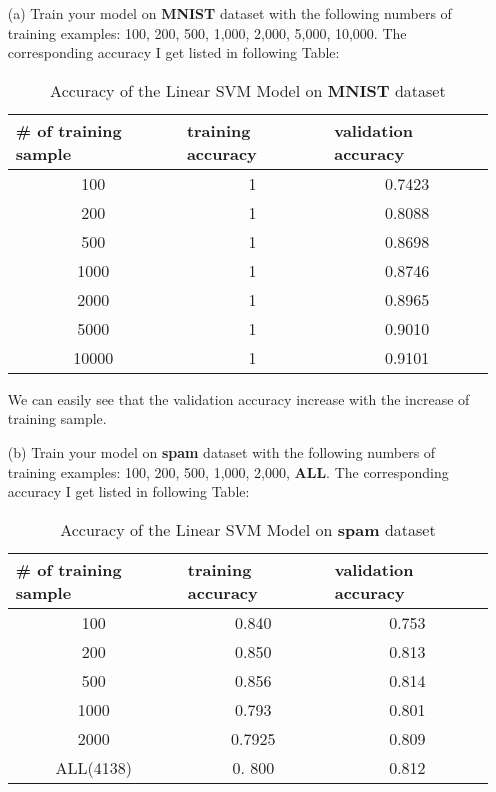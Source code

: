 \documentclass[a4paper,12pt]{article}
\begin{document}
\begin{itemize}
\item[(a)]Train your model on \textbf{MNIST} dataset with the following numbers of training examples: 100, 200, 500, 1,000, 2,000, 5,000, 10,000. The corresponding accuracy I get listed in following Table:
\begin{table}[htbp]
  \centering
  \caption{Accuracy of the Linear SVM Model on \textbf{MNIST} dataset}
    \begin{tabular}{ccc}
    \multicolumn{1}{l}{\# of training sample} & \multicolumn{1}{l}{training accuracy} & \multicolumn{1}{l}{validation accuracy} \\
    \hline
    100 & 1 & 0.7423 \\
    200 & 1 & 0.8088 \\
    500 & 1 & 0.8698 \\
    1000 & 1 & 0.8746 \\
    2000 & 1 & 0.8965 \\
    5000 & 1 & 0.9010 \\
    10000 & 1 & 0.9101 \\
    \end{tabular}%
  \label{tab1}%
\end{table}%

We can easily see that the validation accuracy increase with the increase of training sample.

\item[(b)]Train your model on \textbf{spam} dataset with the following numbers of training examples: 100, 200, 500, 1,000, 2,000, \textbf{ALL}. The corresponding accuracy I get listed in following Table:

\begin{table}[htbp]
  \centering
  \caption{Accuracy of the Linear SVM Model on \textbf{spam} dataset}
    \begin{tabular}{ccc}
    \multicolumn{1}{l}{\# of training sample} & \multicolumn{1}{l}{training accuracy} & \multicolumn{1}{l}{validation accuracy} \\
    \hline
    100 & 0.840 & 0.753 \\
    200 & 0.850 & 0.813 \\
    500 & 0.856 & 0.814 \\
    1000 & 0.793 & 0.801 \\
    2000 & 0.7925 & 0.809 \\
    ALL(4138) & 0. 800& 0.812\\
    \end{tabular}%
  \label{tab2}%
\end{table}%


\end{itemize}
\end{document}
